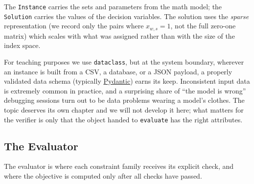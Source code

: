 The \lstinline!Instance! carries the sets and parameters
from the math model; the \lstinline!Solution! carries the
values of the decision variables. The solution uses the \emph{sparse}
representation (we record only the pairs where \(x_{w,s} = 1\), not
the full zero-one matrix) which scales with what was assigned rather
than with the size of the index space.

\begin{platypusinfo}
For teaching purposes we use
\lstinline!dataclass!, but at the system boundary,
wherever an instance is built from a CSV, a database, or a JSON payload,
a properly validated data schema (typically
\href{https://docs.pydantic.dev/}{Pydantic}) earns its keep.
Inconsistent input data is extremely common in practice, and a
surprising share of ``the model is wrong'' debugging sessions turn out
to be data problems wearing a model's clothes. The topic deserves its
own chapter and we will not develop it here; what matters for the
verifier is only that the object handed to
\lstinline!evaluate! has the right attributes.
\end{platypusinfo}

\subsection{The Evaluator}\label{sec:4.2.3}

The evaluator is where each constraint family receives its explicit
check, and where the objective is computed only after all checks have
passed.

